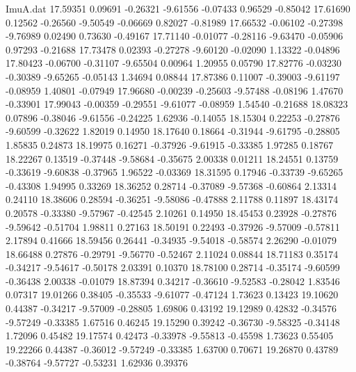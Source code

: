 \begin{filecontents}{ImuA.dat}
  17.59351    0.09691   -0.26321   -9.61556   -0.07433    0.96529   -0.85042
  17.61690    0.12562   -0.26560   -9.50549   -0.06669    0.82027   -0.81989
  17.66532   -0.06102   -0.27398   -9.76989    0.02490    0.73630   -0.49167
  17.71140   -0.01077   -0.28116   -9.63470   -0.05906    0.97293   -0.21688
  17.73478    0.02393   -0.27278   -9.60120   -0.02090    1.13322   -0.04896
  17.80423   -0.06700   -0.31107   -9.65504    0.00964    1.20955    0.05790
  17.82776   -0.03230   -0.30389   -9.65265   -0.05143    1.34694    0.08844
  17.87386    0.11007   -0.39003   -9.61197   -0.08959    1.40801   -0.07949
  17.96680   -0.00239   -0.25603   -9.57488   -0.08196    1.47670   -0.33901
  17.99043   -0.00359   -0.29551   -9.61077   -0.08959    1.54540   -0.21688
  18.08323    0.07896   -0.38046   -9.61556   -0.24225    1.62936   -0.14055
  18.15304    0.22253   -0.27876   -9.60599   -0.32622    1.82019    0.14950
  18.17640    0.18664   -0.31944   -9.61795   -0.28805    1.85835    0.24873
  18.19975    0.16271   -0.37926   -9.61915   -0.33385    1.97285    0.18767
  18.22267    0.13519   -0.37448   -9.58684   -0.35675    2.00338    0.01211
  18.24551    0.13759   -0.33619   -9.60838   -0.37965    1.96522   -0.03369
  18.31595    0.17946   -0.33739   -9.65265   -0.43308    1.94995    0.33269
  18.36252    0.28714   -0.37089   -9.57368   -0.60864    2.13314    0.24110
  18.38606    0.28594   -0.36251   -9.58086   -0.47888    2.11788    0.11897
  18.43174    0.20578   -0.33380   -9.57967   -0.42545    2.10261    0.14950
  18.45453    0.23928   -0.27876   -9.59642   -0.51704    1.98811    0.27163
  18.50191    0.22493   -0.37926   -9.57009   -0.57811    2.17894    0.41666
  18.59456    0.26441   -0.34935   -9.54018   -0.58574    2.26290   -0.01079
  18.66488    0.27876   -0.29791   -9.56770   -0.52467    2.11024    0.08844
  18.71183    0.35174   -0.34217   -9.54617   -0.50178    2.03391    0.10370
  18.78100    0.28714   -0.35174   -9.60599   -0.36438    2.00338   -0.01079
  18.87394    0.34217   -0.36610   -9.52583   -0.28042    1.83546    0.07317
  19.01266    0.38405   -0.35533   -9.61077   -0.47124    1.73623    0.13423
  19.10620    0.44387   -0.34217   -9.57009   -0.28805    1.69806    0.43192
  19.12989    0.42832   -0.34576   -9.57249   -0.33385    1.67516    0.46245
  19.15290    0.39242   -0.36730   -9.58325   -0.34148    1.72096    0.45482
  19.17574    0.42473   -0.33978   -9.55813   -0.45598    1.73623    0.55405
  19.22266    0.44387   -0.36012   -9.57249   -0.33385    1.63700    0.70671
  19.26870    0.43789   -0.38764   -9.57727   -0.53231    1.62936    0.39376

\end{filecontents}
